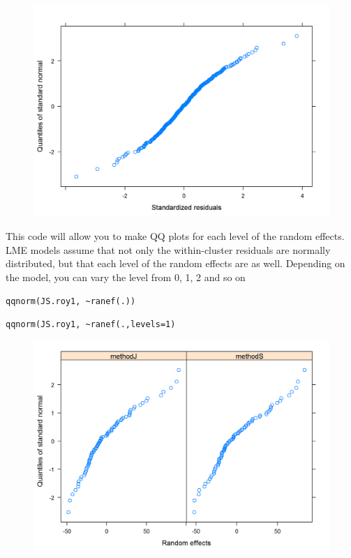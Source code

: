 \documentclass[a4paper,12pt]{article}
\begin{document}
\begin{figure}[h!]
	\centering
	\includegraphics[width=0.9\linewidth]{images/ResidPlot3}
	\caption{}
	\label{fig:ResidPlot3}
\end{figure}

This code will allow you to make QQ plots for each level of the random effects.  LME models assume that not only the within-cluster residuals are normally distributed, but that each level of the random effects are as well. Depending on the model, you can vary the level from 0, 1, 2 and so on
\begin{framed}
\begin{verbatim}
qqnorm(JS.roy1, ~ranef(.))
\end{verbatim}
\end{framed}


\begin{framed}
\begin{verbatim}
qqnorm(JS.roy1, ~ranef(.,levels=1)
\end{verbatim}
\end{framed}
\begin{figure}[h!]
\centering
\includegraphics[width=0.9\linewidth]{images/ResidPlot2}
\caption{}
\label{fig:ResidPlot2}
\end{figure}
\end{document}
